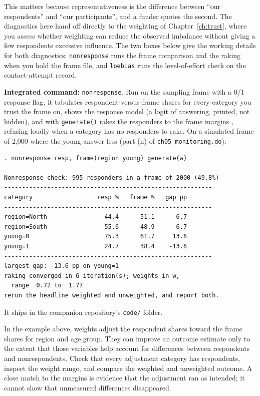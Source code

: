 This matters because representativeness is the difference between \enquote{our respondents} and \enquote{our participants}, and a funder quotes the second. The diagnostics here hand off directly to the weighting of Chapter~\ref{ch:trust}, where you assess whether weighting can reduce the observed imbalance without giving a few respondents excessive influence. The two boxes below give the working details for both diagnostics: \texttt{nonresponse} runs the frame comparison and the raking when you hold the frame file, and \texttt{loebias} runs the level-of-effort check on the contact-attempt record.

\begin{kaobox}[frametitle=Package Integration: \texttt{nonresponse}]
\textbf{Integrated command:} \texttt{nonresponse}. Run on the sampling frame with a 0/1 response flag, it tabulates respondent-versus-frame shares for every category you trust the frame on, shows the response model (a logit of answering, printed, not hidden), and with \texttt{generate()} rakes the responders to the frame margins \parencite{deming1940raking}, refusing loudly when a category has no responders to rake. On a simulated frame of 2{,}000 where the young answer less (part (n) of \texttt{ch05\_monitoring.do}):
\par
{\footnotesize
\begin{verbatim}
. nonresponse resp, frame(region young) generate(w)

Nonresponse check: 995 responders in a frame of 2000 (49.8%)
----------------------------------------------------------
category                  resp %   frame %   gap pp
----------------------------------------------------------
region=North                44.4      51.1     -6.7
region=South                55.6      48.9      6.7
young=0                     75.3      61.7     13.6
young=1                     24.7      38.4    -13.6
----------------------------------------------------------
largest gap: -13.6 pp on young=1
raking converged in 6 iteration(s); weights in w,
  range  0.72 to  1.77
rerun the headline weighted and unweighted, and report both.
\end{verbatim}
}
It ships in the companion repository's \texttt{code/} folder.
\end{kaobox}

In the example above, weights adjust the respondent shares toward the frame shares for region and age group. They can improve an outcome estimate only to the extent that those variables help account for differences between respondents and nonrespondents. Check that every adjustment category has respondents, inspect the weight range, and compare the weighted and unweighted outcome. A close match to the margins is evidence that the adjustment ran as intended; it cannot show that unmeasured differences disappeared.

